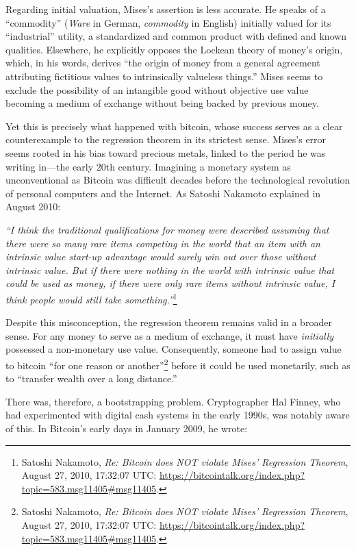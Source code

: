 \documentclass[
  a5paper,
  smalldemyvopaper,10pt,twoside,onecolumn,openright,extrafontsizes,hidelinks]{memoir}
\begin{document}
Regarding initial valuation, Mises's assertion is less accurate. He
speaks of a ``commodity'' (\emph{Ware} in German, \emph{commodity} in
English) initially valued for its ``industrial'' utility, a standardized
and common product with defined and known qualities. Elsewhere, he
explicitly opposes the Lockean theory of money's origin, which, in his
words, derives ``the origin of money from a general agreement
attributing fictitious values to intrinsically valueless things.'' Mises
seems to exclude the possibility of an intangible good without objective
use value becoming a medium of exchange without being backed by previous
money.

Yet this is precisely what happened with bitcoin, whose success serves
as a clear counterexample to the regression theorem in its strictest
sense. Mises's error seems rooted in his bias toward precious metals,
linked to the period he was writing in---the early 20th century.
Imagining a monetary system as unconventional as Bitcoin was difficult
decades before the technological revolution of personal computers and
the Internet. As Satoshi Nakamoto explained in August 2010:

\emph{``I think the traditional qualifications for money were described
assuming that there were so many rare items competing in the world that
an item with an intrinsic value start-up advantage would surely win out
over those without intrinsic value. But if there were nothing in the
world with intrinsic value that could be used as money, if there were
only rare items without intrinsic value, I think people would still take
something.''}\footnote{Satoshi Nakamoto, \emph{Re: Bitcoin does NOT
  violate Mises' Regression Theorem}, August 27, 2010, 17:32:07 UTC:
  \url{https://bitcointalk.org/index.php?topic=583.msg11405\#msg11405}.}

Despite this misconception, the regression theorem remains valid in a
broader sense. For any money to serve as a medium of exchange, it must
have \emph{initially} possessed a non-monetary use value. Consequently,
someone had to assign value to bitcoin ``for one reason or
another''\footnote{Satoshi Nakamoto, \emph{Re: Bitcoin does NOT violate
  Mises' Regression Theorem}, August 27, 2010, 17:32:07 UTC:
  \url{https://bitcointalk.org/index.php?topic=583.msg11405\#msg11405}.}
before it could be used monetarily, such as to ``transfer wealth over a
long distance.''

There was, therefore, a bootstrapping problem. Cryptographer Hal Finney,
who had experimented with digital cash systems in the early 1990s, was
notably aware of this. In Bitcoin's early days in January 2009, he
wrote:
\end{document}
